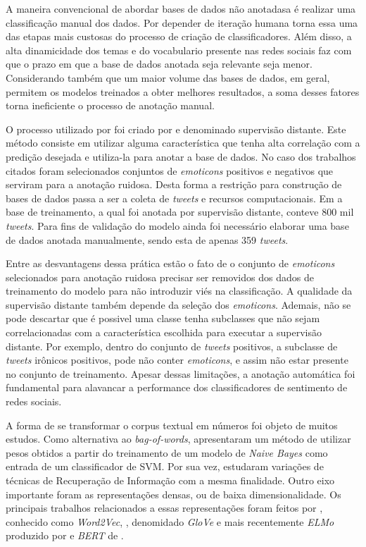 A maneira convencional de abordar bases de dados não anotadasa é realizar uma
classificação manual dos dados.
Por depender de iteração humana torna essa uma das etapas mais custosas do
processo de criação de classificadores.
Além disso, a alta dinamicidade dos temas e do vocabulario presente nas redes
sociais faz com que o prazo em que a base de dados anotada seja relevante seja
menor.
Considerando também que um maior volume das bases de dados, em geral, permitem
os modelos treinados a obter melhores resultados, a soma desses fatores torna
ineficiente o processo de anotação manual.

O processo utilizado por \citet{go09} foi criado por \citet{read05} e denominado
supervisão distante.
Este método consiste em utilizar alguma característica que tenha alta correlação
com a predição desejada e utiliza-la para anotar a base de dados.
No caso dos trabalhos citados foram selecionados conjuntos de \textit{emoticons}
positivos e negativos que serviram para a anotação ruidosa.
Desta forma a restrição para construção de bases de dados passa a ser a coleta
de \textit{tweets} e recursos computacionais.
Em \citet{go09} a base de treinamento, a qual foi anotada por supervisão
distante, conteve 800 mil \textit{tweets}.
Para fins de validação do modelo ainda foi necessário elaborar uma base de
dados anotada manualmente, sendo esta de apenas 359 \textit{tweets}.


Entre as desvantagens dessa prática estão o fato de o conjunto de
\textit{emoticons} selecionados para anotação ruidosa precisar ser removidos dos
dados de treinamento do modelo para não introduzir viés na classificação.
A qualidade da supervisão distante também depende da seleção dos
\textit{emoticons}.
Ademais, não se pode descartar que é possivel uma classe tenha subclasses que
não sejam correlacionadas com a característica escolhida para executar a
supervisão distante.
Por exemplo, dentro do conjunto de \textit{tweets} positivos, a subclasse de
\textit{tweets} irônicos positivos, pode não conter \textit{emoticons}, e assim
não estar presente no conjunto de treinamento.
Apesar dessas limitações, a anotação automática foi fundamental para alavancar
a performance dos classificadores de sentimento de redes sociais.


A forma de se transformar o corpus textual em números foi objeto de muitos
estudos.
Como alternativa ao \textit{bag-of-words}, \citet{wang12} apresentaram um método
de utilizar pesos obtidos a partir do treinamento de um modelo de
\textit{Naive Bayes} como entrada de um classificador de SVM.
Por sua vez, \citet{paltoglou10} estudaram variações de técnicas de Recuperação
de Informação com a mesma finalidade.
Outro eixo importante foram as representações densas, ou de baixa
dimensionalidade.
Os principais trabalhos relacionados a essas representações foram feitos por
\citet{mikolov13}, conhecido como \textit{Word2Vec}, \citet{pennington14},
denomidado \textit{GloVe} e mais recentemente \textit{ELMo} produzido por
\citet{peters18} e \textit{BERT} de \citet{devlin18}.

